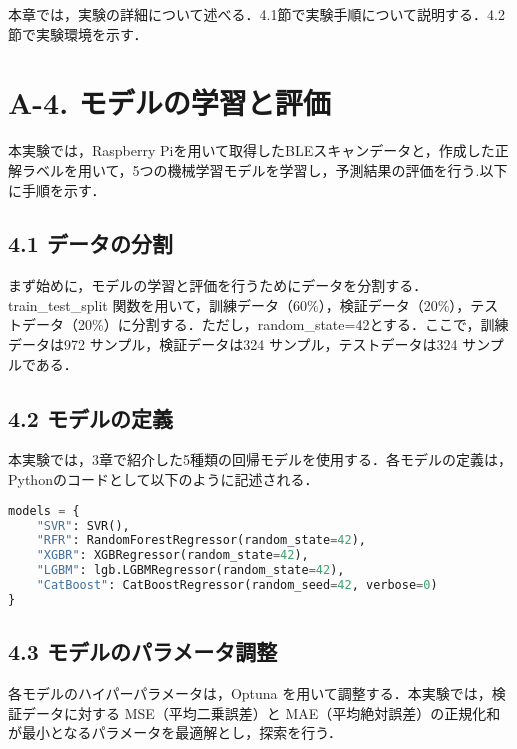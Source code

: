 本章では，実験の詳細について述べる．4.1節で実験手順について説明する．4.2節で実験環境を示す．

\section*{A-4. モデルの学習と評価}
本実験では，Raspberry Piを用いて取得したBLEスキャンデータと，作成した正解ラベルを用いて，5つの機械学習モデルを学習し，予測結果の評価を行う.以下に手順を示す．

\subsection*{4.1 データの分割}
まず始めに，モデルの学習と評価を行うためにデータを分割する．train\_test\_split 関数を用いて，訓練データ（60\%），検証データ（20\%），テストデータ（20\%）に分割する．ただし，random\_state=42とする．ここで，訓練データは972 サンプル，検証データは324 サンプル，テストデータは324 サンプルである．

\subsection*{4.2 モデルの定義}
本実験では，3章で紹介した5種類の回帰モデルを使用する．各モデルの定義は，Pythonのコードとして以下のように記述される．
\begin{lstlisting}[style=mystyle, language=Python, caption=回帰モデルの定義, label={models}]
models = {
    "SVR": SVR(),
    "RFR": RandomForestRegressor(random_state=42),
    "XGBR": XGBRegressor(random_state=42),
    "LGBM": lgb.LGBMRegressor(random_state=42),
    "CatBoost": CatBoostRegressor(random_seed=42, verbose=0)
}
\end{lstlisting}

\subsection*{4.3 モデルのパラメータ調整}
各モデルのハイパーパラメータは，Optuna を用いて調整する．本実験では，検証データに対する MSE（平均二乗誤差）と MAE（平均絶対誤差）の正規化和が最小となるパラメータを最適解とし，探索を行う．

